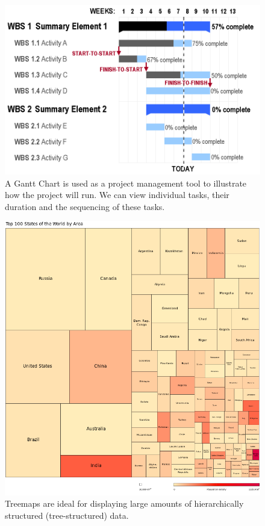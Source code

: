 \begin{figure}[htb]
      \includegraphics[width=\columnwidth]{images/GanttChart.png}
      \caption{A Gantt Chart is used as a project management tool to illustrate how the project will run. We can view individual tasks, their duration and the sequencing of these tasks.}
\end{figure}

\begin{figure}[htb]
      \includegraphics[width=\columnwidth]{images/Treemap.png}
      \caption{Treemaps are ideal for displaying large amounts of hierarchically structured (tree-structured) data.}
\end{figure}
    
